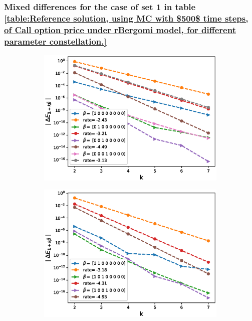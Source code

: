 \documentclass[11pt]{article}
\begin{document}
\FloatBarrier

\subsubsection{Mixed differences for the case of set 1 in table \ref{table:Reference solution, using MC with $500$ time steps, of Call option price under rBergomi model, for different parameter constellation.}}\label{Mixed differences for the case of set 1,linear}




\begin{figure}[h!]
	\centering
	
	\begin{subfigure}{.4\textwidth}
		\centering
		\includegraphics[width=1\linewidth]{./figures/rBergomi_mixed_error_rates/with_linear_hierarchy/N_4/H_043/first_difference_rbergomi_4steps_H_043_K_1_totally_hierarch_with_rate_W1}
		\caption{}
		\label{fig:sub3}
	\end{subfigure}%
	\begin{subfigure}{.4\textwidth}
		\centering
		\includegraphics[width=1\linewidth]{./figures/rBergomi_mixed_error_rates/with_linear_hierarchy/N_4/H_043/mixed_difference_order2_rbergomi_4steps_H_043_K_1_totally_hierarch_with_rate_W1}
		\caption{}
		\label{fig:sub3}
	\end{subfigure}%
	

\end{figure}
\end{document}
